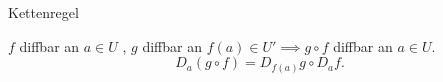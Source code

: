 \documentclass[class=article, crop=false]{standalone}
\begin{document}
\begin{zettel}{Kettenregel}
\begin{flashcard}[]{}
	\begin{theorem}
		$f$ diffbar an $a \in  U$ , $g$ diffbar an $ f (a) \in  U' \implies g \circ f $ diffbar an $a \in  U$.
		\[
			D_a (g \circ f) = D_{f(a)} g \circ  D_a f
		.\]
	\end{theorem}
\end{flashcard}
\end{zettel}
\end{document}
